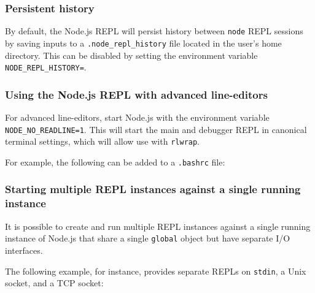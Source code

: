 \subsubsection{Persistent history}\label{persistent-history}

By default, the Node.js REPL will persist history between \texttt{node}
REPL sessions by saving inputs to a \texttt{.node\_repl\_history} file
located in the user's home directory. This can be disabled by setting
the environment variable
\texttt{NODE\_REPL\_HISTORY=\textquotesingle{}\textquotesingle{}}.

\subsubsection{Using the Node.js REPL with advanced
line-editors}\label{using-the-node.js-repl-with-advanced-line-editors}

For advanced line-editors, start Node.js with the environment variable
\texttt{NODE\_NO\_READLINE=1}. This will start the main and debugger
REPL in canonical terminal settings, which will allow use with
\texttt{rlwrap}.

For example, the following can be added to a \texttt{.bashrc} file:

\begin{Shaded}
\begin{Highlighting}[]
\end{Highlighting}
\end{Shaded}

\subsubsection{Starting multiple REPL instances against a single running
instance}\label{starting-multiple-repl-instances-against-a-single-running-instance}

It is possible to create and run multiple REPL instances against a
single running instance of Node.js that share a single \texttt{global}
object but have separate I/O interfaces.

The following example, for instance, provides separate REPLs on
\texttt{stdin}, a Unix socket, and a TCP socket:

